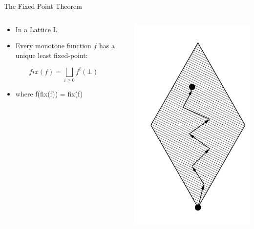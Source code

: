 \begin{frame}{The Fixed Point Theorem}
  \begin{columns}[c]
    \begin{column}{0.8\textwidth}
      \begin{itemize}
      \item In a Lattice L
      \item Every monotone function $f$ has a unique least fixed-point:
      \end{itemize}
      \[ fix(f) = \bigsqcup_{i \ge 0} f^i(\bot) \]
      \begin{itemize}
      \item where f(fix(f)) =  fix(f)
      \end{itemize}
    \end{column}
    
    \begin{column}{0.2\textwidth}
      \includegraphics[width=\textwidth]{graphics/fixed-point_walk}
    \end{column}
  \end{columns}
\end{frame}

